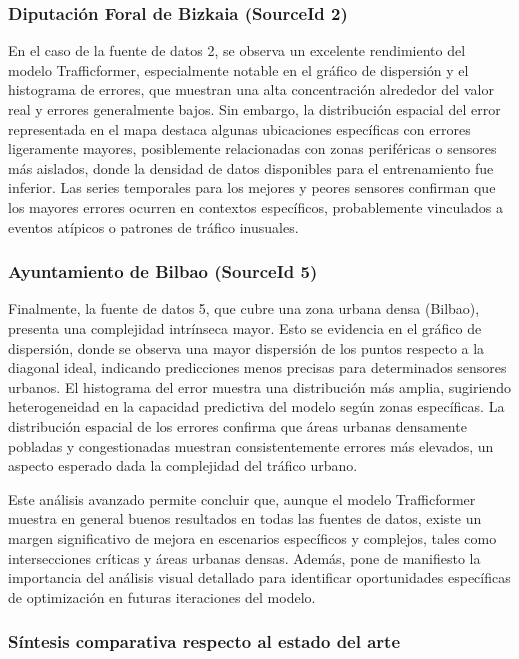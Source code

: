 \subsubsection*{Diputación Foral de Bizkaia (SourceId 2)}
En el caso de la fuente de datos 2, se observa un excelente rendimiento del modelo Trafficformer, especialmente notable en el gráfico de dispersión y el histograma de errores, que muestran una alta concentración alrededor del valor real y errores generalmente bajos. Sin embargo, la distribución espacial del error representada en el mapa destaca algunas ubicaciones específicas con errores ligeramente mayores, posiblemente relacionadas con zonas periféricas o sensores más aislados, donde la densidad de datos disponibles para el entrenamiento fue inferior. Las series temporales para los mejores y peores sensores confirman que los mayores errores ocurren en contextos específicos, probablemente vinculados a eventos atípicos o patrones de tráfico inusuales.

\subsubsection*{Ayuntamiento de Bilbao (SourceId 5)}
Finalmente, la fuente de datos 5, que cubre una zona urbana densa (Bilbao), presenta una complejidad intrínseca mayor. Esto se evidencia en el gráfico de dispersión, donde se observa una mayor dispersión de los puntos respecto a la diagonal ideal, indicando predicciones menos precisas para determinados sensores urbanos. El histograma del error muestra una distribución más amplia, sugiriendo heterogeneidad en la capacidad predictiva del modelo según zonas específicas. La distribución espacial de los errores confirma que áreas urbanas densamente pobladas y congestionadas muestran consistentemente errores más elevados, un aspecto esperado dada la complejidad del tráfico urbano.

Este análisis avanzado permite concluir que, aunque el modelo Trafficformer muestra en general buenos resultados en todas las fuentes de datos, existe un margen significativo de mejora en escenarios específicos y complejos, tales como intersecciones críticas y áreas urbanas densas. Además, pone de manifiesto la importancia del análisis visual detallado para identificar oportunidades específicas de optimización en futuras iteraciones del modelo.

\subsubsection*{Síntesis comparativa respecto al estado del arte}

